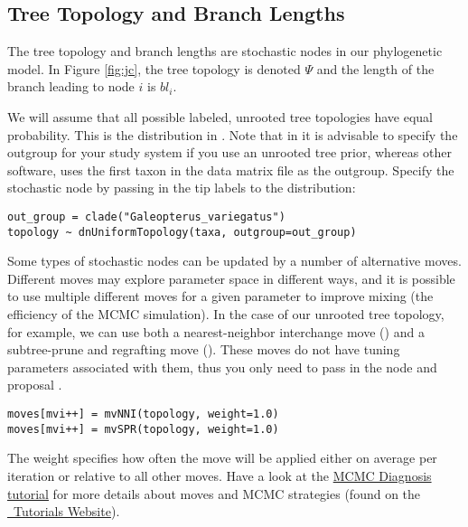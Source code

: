 \bigskip
\subsection{Tree Topology and Branch Lengths}

The tree topology and branch lengths are stochastic nodes in our phylogenetic model. 
In Figure \ref{fig:jc}, the tree topology is denoted $\Psi$ and the length of the branch leading to node $i$ is $bl_i$.

We will assume that all possible labeled, unrooted tree topologies have equal probability. 
This is the  distribution in \RevBayes. 
Note that in \RevBayes it is advisable to specify the outgroup for your study system if you use an unrooted tree prior, whereas other software, \EG \MrBayes uses the first taxon in the data matrix file as the outgroup.
Specify the  stochastic node by passing in the tip labels  to the  distribution:
{\tt \begin{snugshade*}
\begin{lstlisting}
out_group = clade("Galeopterus_variegatus")
topology ~ dnUniformTopology(taxa, outgroup=out_group)
\end{lstlisting}
\end{snugshade*}}

Some types of stochastic nodes can be updated by a number of alternative moves. 
Different moves may explore parameter space in different ways, and it is possible to use multiple different moves for a given parameter to improve mixing (the efficiency of the MCMC simulation). 
In the case of our unrooted tree topology, for example, we can use both a nearest-neighbor interchange move () and a subtree-prune and regrafting move (). 
These moves do not have tuning parameters associated with them, thus you only need to pass in the  node and proposal . 
{\tt \begin{snugshade*}
\begin{lstlisting}
moves[mvi++] = mvNNI(topology, weight=1.0)
moves[mvi++] = mvSPR(topology, weight=1.0)
\end{lstlisting}
\end{snugshade*}}
The weight specifies how often the move will be applied either on average per iteration or relative to all other moves.
Have a look at the \href{https://github.com/revbayes/revbayes_tutorial/raw/master/tutorial_TeX/RB_MCMC_Tutorial/RB_MCMC_Tutorial.pdf}{MCMC Diagnosis tutorial} for more details about moves and MCMC strategies (found on the \href{http://revbayes.github.io/tutorials.html}{\RevBayes~Tutorials Website}).


